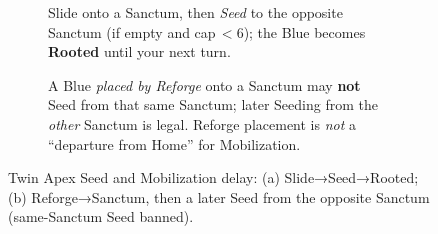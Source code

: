 \begin{figure}[H]
\begin{subfigure}[t]{0.48\linewidth}
    \caption{Slide onto a Sanctum, then \emph{Seed} to the opposite Sanctum (if empty and cap\,$<\!6$); the Blue becomes \textbf{Rooted} until your next turn.}
  \end{subfigure}
  \hfill
  \begin{subfigure}[t]{0.48\linewidth}
    \centering
    \hspace{6pt}

    \caption{A Blue \emph{placed by Reforge} onto a Sanctum may \textbf{not} Seed from that same Sanctum; later Seeding from the \emph{other} Sanctum is legal. Reforge placement is \emph{not} a “departure from Home” for Mobilization.}
  \end{subfigure}

  \caption{Twin Apex Seed and Mobilization delay: (a) Slide→Seed→Rooted; (b) Reforge→Sanctum, then a later Seed from the opposite Sanctum (same-Sanctum Seed banned).}
  \label{fig:seed-mobilize}
\end{figure}

